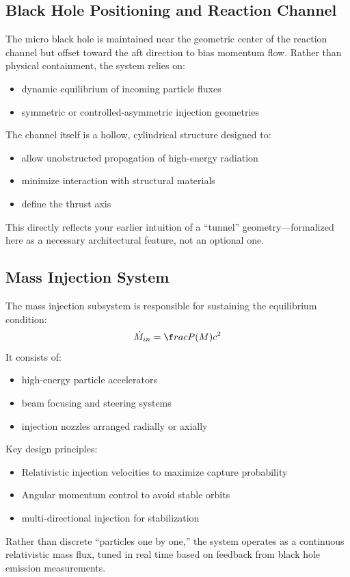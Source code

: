 \documentclass[conference]{IEEEtran}
\begin{document}
\subsection{Black Hole Positioning and Reaction Channel}
The micro black hole is maintained near the geometric center of the reaction channel but offset toward the aft direction to bias momentum flow.
Rather than physical containment, the system relies on:
\begin{itemize}
\item dynamic equilibrium of incoming particle fluxes
\item symmetric or controlled-asymmetric injection geometries
\end{itemize}
The channel itself is a hollow, cylindrical structure designed to:
\begin{itemize}
\item allow unobstructed propagation of high-energy radiation
\item minimize interaction with structural materials
\item define the thrust axis
\end{itemize}
This directly reflects your earlier intuition of a “tunnel” geometry—formalized here as a necessary architectural feature, not an optional one.
\subsection{Mass Injection System}
The mass injection subsystem is responsible for sustaining the equilibrium condition:
\begin{equation}
\dot{M}_{in}=\f
rac{P(M)}{c^2}
\end{equation}
It consists of:
\begin{itemize}
\item high-energy particle accelerators
\item beam focusing and steering systems
\item injection nozzles arranged radially or axially
\end{itemize}
Key design principles:
\begin{itemize}
\item Relativistic injection velocities to maximize capture probability
\item Angular momentum control to avoid stable orbits
\item multi-directional injection for stabilization
\end{itemize}
Rather than discrete “particles one by one,” the system operates as a continuous relativistic mass flux, tuned in real time based on feedback from black hole emission measurements.
\end{document}
